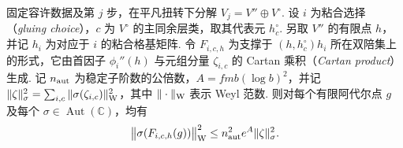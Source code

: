 \begin{lemma}[粘合中单个乘积形式的点值]
\label{lem:c-gluing-product-value}
\emitthmsource
固定容许数据及第 $j$ 步，在平凡扭转下分解 $V_j=V''\oplus V^\circ$. 设 $i$ 为粘合选择（\emph{gluing choice}），$c$ 为 $V^\circ$ 的主同余层类，取其代表元 $h^\circ_c$. 另取 $V''$ 的有限点 $h$，并记 $h_i$ 为对应于 $i$ 的粘合格基矩阵. 令 $F_{i,c,h}$ 为支撑于 $(h,h^\circ_c)h_i$ 所在双陪集上的形式，它由首因子 $\phi_i''(h)$ 与元组分量 $\zeta_{i,c}$ 的 Cartan 乘积（\emph{Cartan product}）生成. 记 $n_{\rm aut}$ 为稳定子阶数的公倍数，$A=fmb(\log b)^2$，并记 $\|\zeta\|_\sigma^2=\sum_{i,c}\|\sigma(\zeta_{i,c})\|_{\rm W}^2$，其中 $\|\cdot\|_{\rm W}$ 表示 Weyl 范数. 则对每个有限阿代尔点 $g$ 及每个 $\sigma\in\operatorname{Aut}(\mathbb C)$，均有
\[
 \bigl\|\sigma(F_{i,c,h}(g))\bigr\|_{\rm W}^2
 \le n_{\rm aut}^2 e^A\|\zeta\|_\sigma^2.
\]
\end{lemma}

